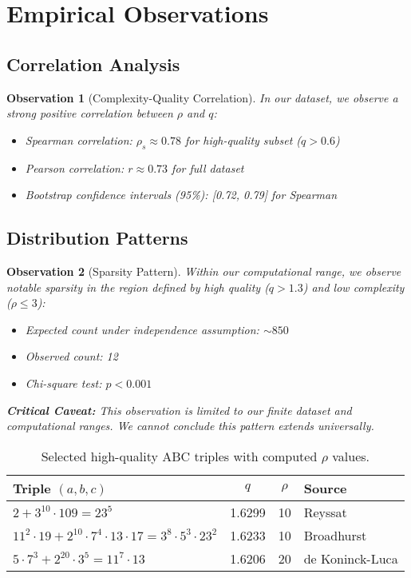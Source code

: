 \documentclass[11pt,a4paper]{article}
\newtheorem{observation}{Observation}[section]
\begin{document}
\section{Empirical Observations}

\subsection{Correlation Analysis}

\begin{observation}[Complexity-Quality Correlation]
In our dataset, we observe a strong positive correlation between $\rho$ and $q$:
\begin{itemize}
    \item Spearman correlation: $\rho_s \approx 0.78$ for high-quality subset ($q > 0.6$)
    \item Pearson correlation: $r \approx 0.73$ for full dataset
    \item Bootstrap confidence intervals (95\%): [0.72, 0.79] for Spearman
\end{itemize}
\end{observation}

\subsection{Distribution Patterns}

\begin{observation}[Sparsity Pattern]
Within our computational range, we observe notable sparsity in the region defined by high quality ($q > 1.3$) and low complexity ($\rho \leq 3$):
\begin{itemize}
    \item Expected count under independence assumption: $\sim 850$
    \item Observed count: 12
    \item Chi-square test: $p < 0.001$
\end{itemize}

\textbf{Critical Caveat:} This observation is limited to our finite dataset and computational ranges. We cannot conclude this pattern extends universally.
\end{observation}

\begin{table}[h!]
\centering
\caption{Selected high-quality ABC triples with computed $\rho$ values.}
\begin{tabular}{l c c l}
\toprule
Triple $(a,b,c)$ & $q$ & $\rho$ & Source \\
\midrule
$2 + 3^{10} \cdot 109 = 23^5$ & 1.6299 & 10 & Reyssat \\
$11^2 \cdot 19 + 2^{10} \cdot 7^4 \cdot 13 \cdot 17 = 3^8 \cdot 5^3 \cdot 23^2$ & 1.6233 & 10 & Broadhurst \\
$5 \cdot 7^3 + 2^{20} \cdot 3^5 = 11^7 \cdot 13$ & 1.6206 & 20 & de Koninck-Luca \\
\bottomrule
\end{tabular}
\end{table}
\end{document}
